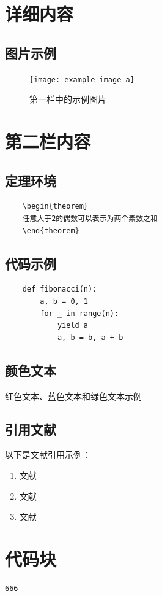 \documentclass[14pt,a4paper,UTF8,twoside]{article}
\begin{document}
\begin{multicols}{2}
    \section{详细内容}
    \lipsum[1-2] %

    \subsection{图片示例}
    \begin{figure}[H]
        \centering
        \texttt{[image: example-image-a]}
        \caption{第一栏中的示例图片}
    \end{figure}

    \columnbreak %

    \section{第二栏内容}
    \subsection{定理环境}
    \begin{verbatim}
    \begin{theorem}
    任意大于2的偶数可以表示为两个素数之和
    \end{theorem}
    \end{verbatim}

    \subsection{代码示例}
    \begin{verbatim}
    def fibonacci(n):
        a, b = 0, 1
        for _ in range(n):
            yield a
            a, b = b, a + b
    \end{verbatim}

    \subsection{颜色文本}
    {\color{red}红色文本}、{\color{blue}蓝色文本}和{\color{green}绿色文本}示例

    \subsection{引用文献}
    以下是文献引用示例：
    \begin{enumerate}
        \item 文献 \cite{key1}
        \item 文献\cite{key2}
        \item 文献\cite{key3}
    \end{enumerate}

    \lipsum[3-5] %

\end{multicols}

\section{代码块}

\begin{lstlisting}
666
\end{lstlisting}
\end{document}
